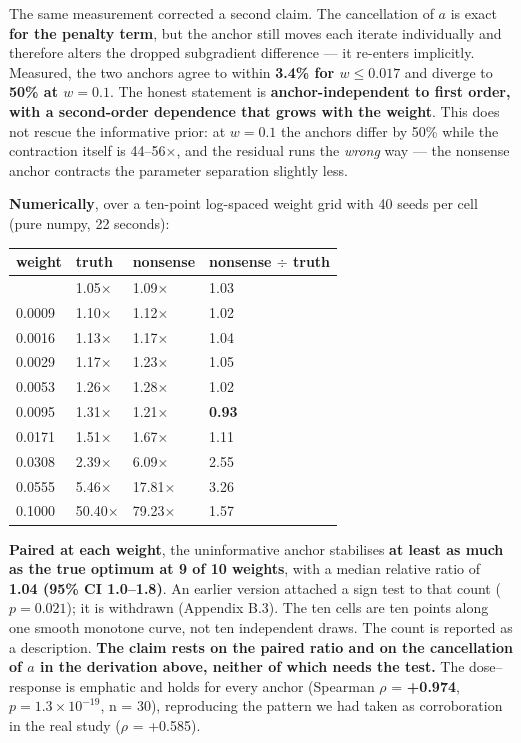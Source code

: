 The same measurement corrected a second claim. The cancellation of \(a\) is exact \textbf{for the penalty
term}, but the anchor still moves each iterate individually and therefore alters the dropped
subgradient difference --- it re-enters implicitly. Measured, the two anchors agree to within
\textbf{3.4\% for \(w \leq 0.017\)} and diverge to \textbf{50\% at \(w = 0.1\)}. The honest statement is
\textbf{anchor-independent to first order, with a second-order dependence that grows with the weight}.
This does not rescue the informative prior: at \(w = 0.1\) the anchors differ by 50\% while the
contraction itself is 44--56\(\times\), and the residual runs the \emph{wrong} way --- the nonsense anchor
contracts the parameter separation slightly less.

\textbf{Numerically}, over a ten-point log-spaced weight grid with 40 seeds per cell
(pure numpy, 22 seconds):

{\def\LTcaptype{none} %
\begin{longtable}[]{@{}llll@{}}
\toprule\noalign{}
weight & truth & nonsense & nonsense $\div$ truth \\
\midrule\noalign{}
\endhead
\bottomrule\noalign{}
\endlastfoot
0.0005 & 1.05$\times$ & 1.09$\times$ & 1.03 \\
0.0009 & 1.10$\times$ & 1.12$\times$ & 1.02 \\
0.0016 & 1.13$\times$ & 1.17$\times$ & 1.04 \\
0.0029 & 1.17$\times$ & 1.23$\times$ & 1.05 \\
0.0053 & 1.26$\times$ & 1.28$\times$ & 1.02 \\
0.0095 & 1.31$\times$ & 1.21$\times$ & \textbf{0.93} \\
0.0171 & 1.51$\times$ & 1.67$\times$ & 1.11 \\
0.0308 & 2.39$\times$ & 6.09$\times$ & 2.55 \\
0.0555 & 5.46$\times$ & 17.81$\times$ & 3.26 \\
0.1000 & 50.40$\times$ & 79.23$\times$ & 1.57 \\
\end{longtable}
}

\textbf{Paired at each weight}, the uninformative anchor stabilises \textbf{at least as much as the true
optimum at 9 of 10 weights}, with a median relative ratio of \textbf{1.04 (95\% CI 1.0--1.8)}. An
earlier version attached a sign test to that count (\(p = 0.021\)); it is withdrawn (Appendix
B.3). The ten cells are ten points along one smooth monotone curve, not ten independent draws.
The count is reported as a description. \textbf{The claim rests on the paired ratio and on the
cancellation of \(a\) in the derivation above, neither of which needs the test.} The dose--response is emphatic and holds for every anchor
(Spearman $\rho$ = \textbf{+0.974}, \(p = 1.3 \times 10^{-19}\), n = 30), reproducing the pattern we had taken as
corroboration in the real study ($\rho$ = +0.585).

